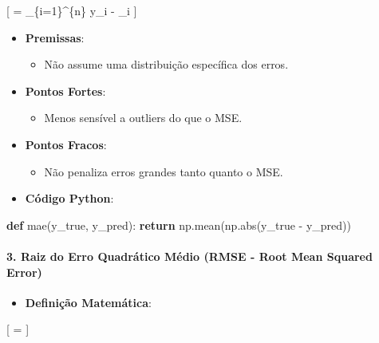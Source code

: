 \documentclass[11pt]{article}
\providecommand{\tightlist}{%
      \setlength{\itemsep}{0pt}\setlength{\parskip}{0pt}}
\newenvironment{Shaded}{}{}
\newcommand{\KeywordTok}[1]{\textcolor[rgb]{0.00,0.44,0.13}{\textbf{{#1}}}}
\newcommand{\NormalTok}[1]{{#1}}
\newcommand{\ControlFlowTok}[1]{\textcolor[rgb]{0.00,0.44,0.13}{\textbf{{#1}}}}
\newcommand{\OperatorTok}[1]{\textcolor[rgb]{0.40,0.40,0.40}{{#1}}}
\newcommand{\BuiltInTok}[1]{{#1}}
\begin{document}
{[}  =  \sum\_\{i=1\}\^{}\{n\} \textbar y\_i -
\_i\textbar{} {]}

\begin{itemize}
\tightlist
\item
  \textbf{Premissas}:

  \begin{itemize}
  \tightlist
  \item
    Não assume uma distribuição específica dos erros.
  \end{itemize}
\item
  \textbf{Pontos Fortes}:

  \begin{itemize}
  \tightlist
  \item
    Menos sensível a outliers do que o MSE.
  \end{itemize}
\item
  \textbf{Pontos Fracos}:

  \begin{itemize}
  \tightlist
  \item
    Não penaliza erros grandes tanto quanto o MSE.
  \end{itemize}
\item
  \textbf{Código Python}:
\end{itemize}

\begin{Shaded}
\begin{Highlighting}[]
\KeywordTok{def}\NormalTok{ mae(y\_true, y\_pred):}
    \ControlFlowTok{return}\NormalTok{ np.mean(np.}\BuiltInTok{abs}\NormalTok{(y\_true }\OperatorTok{{-}}\NormalTok{ y\_pred))}
\end{Highlighting}
\end{Shaded}

\hypertarget{raiz-do-erro-quadruxe1tico-muxe9dio-rmse---root-mean-squared-error}{%
\paragraph{3. Raiz do Erro Quadrático Médio (RMSE - Root Mean Squared
Error)}\label{raiz-do-erro-quadruxe1tico-muxe9dio-rmse---root-mean-squared-error}}

\begin{itemize}
\tightlist
\item
  \textbf{Definição Matemática}:
\end{itemize}

{[}  =  {]}
\end{document}
